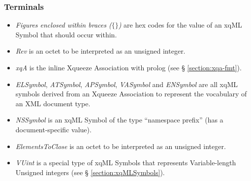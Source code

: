 
\subsubsection{Terminals}
\begin{itemize}
\item \textit{Figures enclosed within braces ($\{\}$)} are hex codes for the value
  of an xqML Symbol that should occur within.
\item \textit{Rev} is an octet to be interpreted as an unsigned integer.
\item \textit{xqA} is the inline Xqueeze Association with prolog
  (see \S{} \ref{section:xqa-fmt}).
\item \textit{ELSymbol}, \textit{ATSymbol}, \textit{APSymbol},
  \textit{VASymbol} and \textit{ENSymbol} are all xqML symbols derived
  from an Xqueeze Association to represent the vocabulary of an XML
  document type.
\item \textit{NSSymbol} is an xqML Symbol of the type ``namespace prefix''
  (has a document-specific value).
\item \textit{ElementsToClose} is an octet to be interpreted as an unsigned
  integer.
\item \textit{VUint} is a special type of xqML Symbols that represents
  Variable-length Unsigned integers (see \S{} \ref{section:xqMLSymbols}).
\end{itemize}

